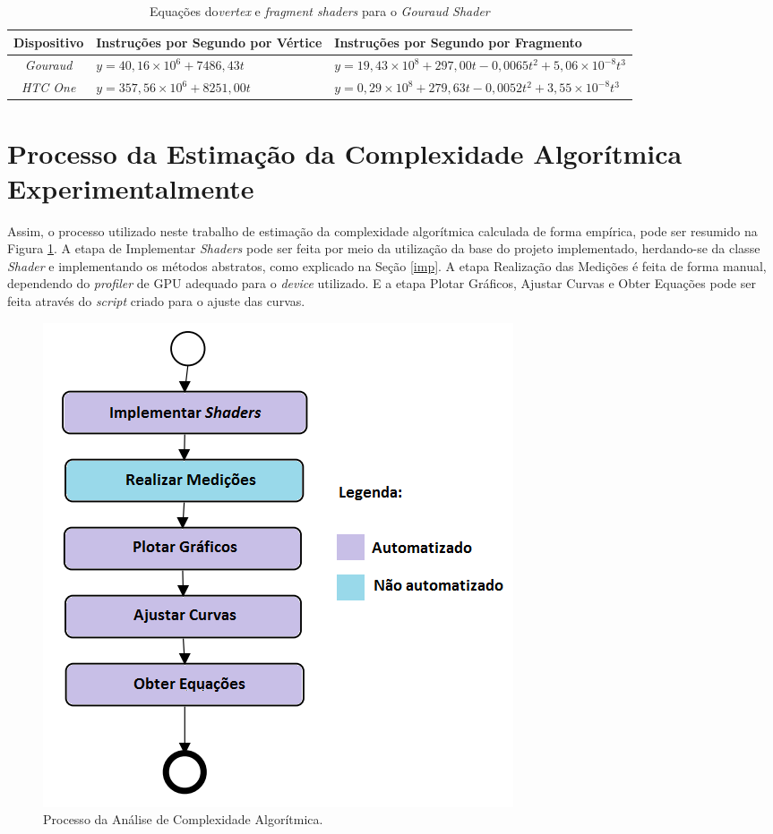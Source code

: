 	\begin{table}[ht]
	\centering	
	\begin{tabularx}{0.9\textwidth}{cXX}
		\toprule
		\textbf{Dispositivo} & \textbf{Instruções por Segundo por Vértice} & \textbf{Instruções por Segundo por Fragmento}  \\
		\midrule
		\textit{Gouraud} & $y = 40,16 \times 10^6 + 7486,43t$ & $y = 19,43 \times 10 ^8 + 297,00t - 0,0065t^2 + 5,06 \times 10^{-8}t^3 $  \\
		\textit{HTC One} & $y = 357,56 \times 10^6 + 8251,00t$ & $y = 0,29 \times 10 ^8 + 279,63t - 0,0052t^2 + 3,55 \times 10^{-8}t^3 $  \\

		\bottomrule
	\end{tabularx}
	\caption{Equações do\textit{vertex} e \textit{fragment shaders} para o \textit{Gouraud Shader}}
	\label{vertex_frag_comp}
	\end{table}

\section{Processo da Estimação da Complexidade Algorítmica Experimentalmente}  

	Assim, o processo utilizado neste trabalho de estimação da complexidade algorítmica calculada de forma empírica, pode ser resumido na Figura \ref{processo}. A etapa de Implementar \textit{Shaders} pode ser feita por meio da utilização da base do projeto implementado, herdando-se da classe \textit{Shader} e implementando os métodos abstratos, como explicado na Seção \ref{imp}. A etapa Realização das Medições é feita de forma manual, dependendo do \textit{profiler} de GPU adequado para o \textit{device} utilizado. E a etapa Plotar Gráficos, Ajustar Curvas e Obter Equações pode ser feita através do \textit{script} criado para o ajuste das curvas.

	\begin{figure}[ht]
	\centering
		\includegraphics[keepaspectratio=true,scale=0.5]{figuras/processo.png}
	\caption{Processo da Análise de Complexidade Algorítmica.}
	\label{processo}
	\end{figure}
